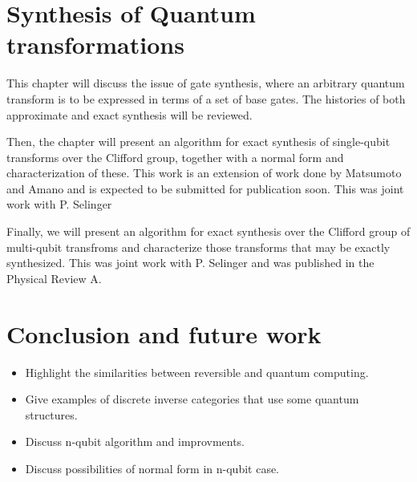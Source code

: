 \section*{Synthesis of Quantum transformations}
This chapter will discuss the issue of gate synthesis, where an arbitrary quantum transform is to
be expressed in terms of a set of base gates. The histories of both approximate and exact 
synthesis will be reviewed.

Then, the chapter will present an algorithm for exact synthesis of single-qubit transforms over
the Clifford group, together
with a normal form and characterization of these. This work is an extension of work done by
Matsumoto and Amano and is expected to be submitted for publication soon. This was joint work with
P. Selinger

Finally, we will present an algorithm for exact synthesis over the Clifford group
of multi-qubit transfroms and characterize those transforms that may be exactly synthesized. This
was joint work with P. Selinger and was published in the Physical Review A. 

\section*{Conclusion and future work}

\begin{itemize}
  \item Highlight the similarities between reversible and quantum computing.
  \item Give examples of discrete inverse categories that use some quantum structures.
  \item Discuss n-qubit algorithm and improvments.
  \item Discuss possibilities of normal form in n-qubit case.
\end{itemize}